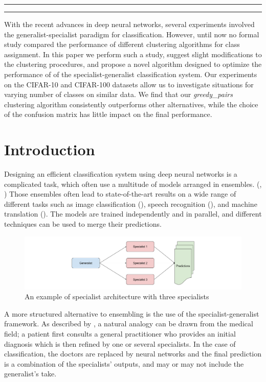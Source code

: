 \documentclass[12pt]{article}
\makeatletter
\def\maketitle{
    \begin{centering}
    \par\rule{\textwidth}{2pt}
    \par\hfill
    \par\textbf{\LARGE\@title}
    \par\hfill
    \par{\textit{\@author}}
    \par\hfill
    \par{\@date}
    \par\rule{\textwidth}{2pt}
    \end{centering}
}
\makeatother
\begin{document}
\thispagestyle{empty}
\maketitle
\hfill
\abstract
With the recent advances in deep neural networks, several experiments
involved the generalist-specialist paradigm for classification. However,
until now no formal study compared the performance of different
clustering algorithms for class assignment. In this paper we perform
such a study, suggest slight modifications to the clustering procedures,
and propose a novel algorithm designed to optimize the performance of of
the specialist-generalist classification system. Our experiments on the
CIFAR-10 and CIFAR-100 datasets allow us to investigate situations for
varying number of classes on similar data. We find that our
\emph{greedy\_pairs} clustering algorithm consistently outperforms other
alternatives, while the choice of the confusion matrix has little impact
on the final performance.

\section{Introduction}\label{introduction}

Designing an efficient classification system using deep neural networks
is a complicated task, which often use a multitude of models arranged in
ensembles. (\cite{galaxy}, \cite{vgg}) Those ensembles often lead to
state-of-the-art results on a wide range of different tasks such as
image classification (\cite{inception}), speech recognition
(\cite{deepspeech2}), and machine translation (\cite{seq2seq}). The
models are trained independently and in parallel, and different
techniques can be used to merge their predictions.

\begin{figure}[htbp]
\centering
\includegraphics{./figs/specialists.png}
\caption{An example of specialist architecture with three specialists}
\end{figure}

A more structured alternative to ensembling is the use of the
specialist-generalist framework. As described by \cite{bochereau1990}, a
natural analogy can be drawn from the medical field; a patient first
consults a general practitioner who provides an initial diagnosis which
is then refined by one or several specialists. In the case of
classification, the doctors are replaced by neural networks and the
final prediction is a combination of the specialists' outputs, and may
or may not include the generalist's take.
\end{document}

